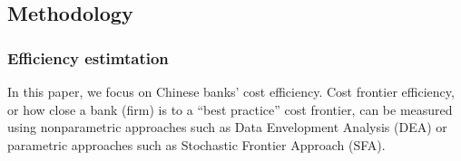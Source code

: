\documentclass[
  12pt,
  a4paper,
]{scrreprt}
\begin{document}
{{{{\begin{table}
{}

\end{table}%

\subsection{Methodology}\label{methodology-1}

\subsubsection{Efficiency estimtation}\label{efficiency-estimtation}

In this paper, we focus on Chinese banks' cost efficiency. Cost frontier
efficiency, or how close a bank (firm) is to a ``best practice'' cost
frontier, can be measured using nonparametric approaches such as Data
Envelopment Analysis (DEA) or parametric approaches such as Stochastic
Frontier Approach (SFA).

}}}}
\end{document}
